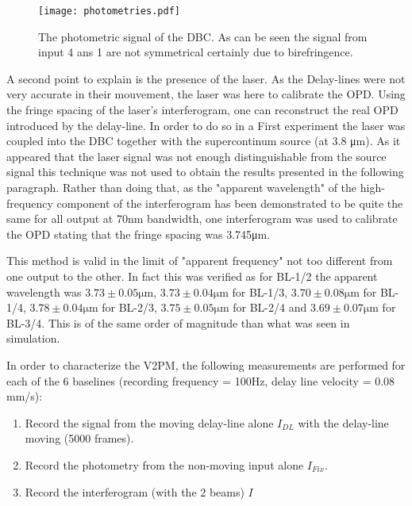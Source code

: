 \begin{figure}
 \centering
 \texttt{[image: photometries.pdf]}
 \caption{The photometric signal of the DBC. As can be seen the signal from input 4 ans 1 are not symmetrical certainly due to birefringence.}
 \label{fig:photometries}
\end{figure}

A second point to explain is the presence of the laser. As the Delay-lines were not very accurate in their mouvement, the laser was here to calibrate the OPD. Using the fringe spacing of the laser's interferogram, one can reconstruct the real OPD introduced by the delay-line. In order to do so in a First experiment the laser was coupled into the DBC together with the supercontinum source (at 3.8 \si{\micro\meter}). As it appeared that the laser signal was not enough distinguishable from the source signal this technique was not used to obtain the results presented in the following paragraph.  Rather than doing that, as the "apparent wavelength" of the high-frequency component of the interferogram has been demonstrated to be quite the same for all output at 70nm bandwidth, one interferogram was used to calibrate the OPD stating that the fringe spacing was 3.745\si{\micro\meter}. 

This method is valid in the limit of "apparent frequency" not too different from one output to the other. In fact this was verified as for BL-1/2 the apparent wavelength was $3.73\pm0.05\si{\micro\meter}$, $3.73\pm0.04\si{\micro\meter}$ for BL-1/3, $3.70\pm0.08\si{\micro\meter}$ for BL-1/4, $3.78\pm0.04\si{\micro\meter}$ for BL-2/3, $3.75\pm0.05\si{\micro\meter}$ for BL-2/4 and $3.69\pm0.07\si{\micro\meter}$ for BL-3/4. This is of the same order of magnitude than what was seen in simulation. 

In order to characterize the V2PM, the following measurements are performed for each of the 6 baselines (recording frequency = 100Hz, delay line velocity = 0.08 mm/s):
\begin{enumerate}
 \item Record the signal from the moving delay-line alone $I_{DL}$ with the delay-line moving (5000 frames).
 \item Record the photometry from the non-moving input alone $I_{Fix}$.
 \item Record the interferogram (with the 2 beams) $I$
\end{enumerate}

